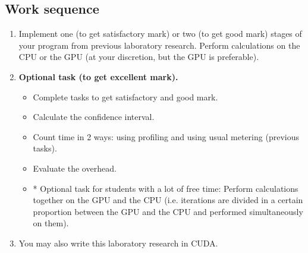 { %
	\subsection{Work sequence}
	\begin{enumerate}
		\item Implement one (to get satisfactory mark) or two (to get good mark) stages of your program from previous laboratory research.  Perform calculations on the CPU or the GPU (at your discretion, but the GPU is preferable).
		\item\textbf{Optional task (to get excellent mark).}
			\begin{itemize}
				\item Complete tasks to get satisfactory and good mark.
				\item Calculate the confidence interval.
				\item Count time in 2 ways: using profiling and using usual metering (previous tasks).
				\item Evaluate the overhead.
				\item* Optional task for students with a lot of free time: Perform calculations together on the GPU and the CPU (i.e. iterations are divided in a certain proportion between the GPU and the CPU and performed simultaneously on them).
			\end{itemize}
		\item You may also write this laboratory research in CUDA.
	\end{enumerate}
}